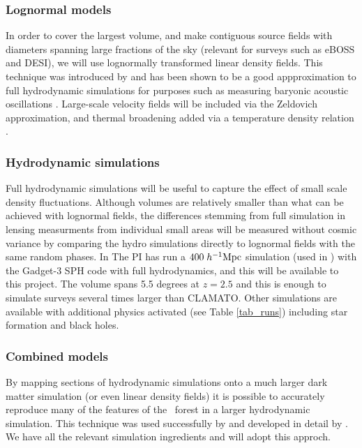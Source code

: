 \subsubsection{Lognormal models}
In order to cover the largest volume, and make contiguous source
fields with diameters spanning large fractions of the sky (relevant for
surveys such as eBOSS and DESI), we will use lognormally transformed
linear density fields. This technique was introduced by \cite{bi1997}
and has been shown to be a good appproximation to full hydrodynamic
simulations for purposes such as measuring baryonic acoustic oscillations
\cite{legoff}. Large-scale velocity fields will be included via the
Zeldovich approximation, and thermal broadening added via a temperature
density relation \cite{keating17}.

\subsubsection{Hydrodynamic simulations}
Full hydrodynamic simulations will be useful to capture the effect of
small scale density fluctuations.
 Although volumes are relatively smaller
than what can be achieved with lognormal fields, the differences stemming
from
full simulation  in
lensing measurments from individual small areas will be measured without
cosmic variance by comparing the hydro simulations directly to lognormal
fields with the same random phases. In 
The PI has run  a $400\;h^{-1}{\rm Mpc}$ simulation 
(used in \cite{cisewski}) 
 with 
the Gadget-3 SPH code with full hydrodynamics, and this will be available to
this project. The volume spans 5.5 degrees at $z=2.5$ and this is enough
to simulate surveys several times larger than CLAMATO. Other
simulations are available with additional physics activated (see Table 
\ref{tab_runs})
including star formation and black holes.

\subsubsection{Combined models}
By mapping sections of hydrodynamic simulations onto a much larger
dark matter simulation (or even linear density fields) it is possible
to accurately reproduce many of the features of the \lya\ forest
in a larger hydrodynamic simulation. This
technique was used successfully by \cite{croft2004} and developed in
detail by \cite{peirani2014}. We have all the relevant 
simulation ingredients and will adopt this approch.


